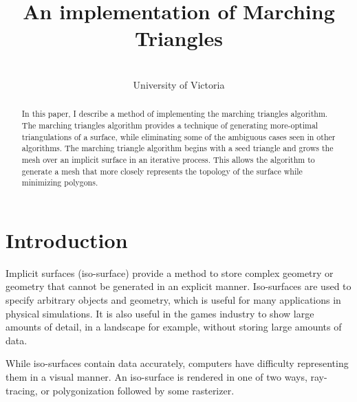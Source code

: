 \documentclass[conference]{acmsiggraph}
\title{An implementation of Marching Triangles}
\author{
	\Author \\
	University of Victoria\\
	\Email}
\begin{document}


\maketitle

\begin{abstract}
	In this paper, I describe a method of implementing the marching
	triangles algorithm. The marching triangles algorithm provides a
	technique of generating more-optimal triangulations of a surface, while eliminating some of the ambiguous cases seen in other algorithms.
	The marching triangle algorithm begins with a seed triangle and grows
	the mesh over an implicit surface in an iterative process. This allows
	the algorithm to generate a mesh that more closely represents the
	topology of the surface while minimizing polygons.
\end{abstract}

\keywordlist

\copyrightspace


\section{Introduction}
Implicit surfaces (iso-surface) provide a method to store complex geometry or
geometry that cannot be generated in an explicit manner. Iso-surfaces are used
to specify arbitrary objects and geometry, which is useful for many
applications in physical simulations. It is also useful in the games industry
to show large amounts of detail, in a landscape for example, without storing
large amounts of data.

While iso-surfaces contain data accurately, computers have difficulty
representing them in a visual manner. An iso-surface is rendered in one of two
ways, ray-tracing, or polygonization followed by some rasterizer.
\end{document}
